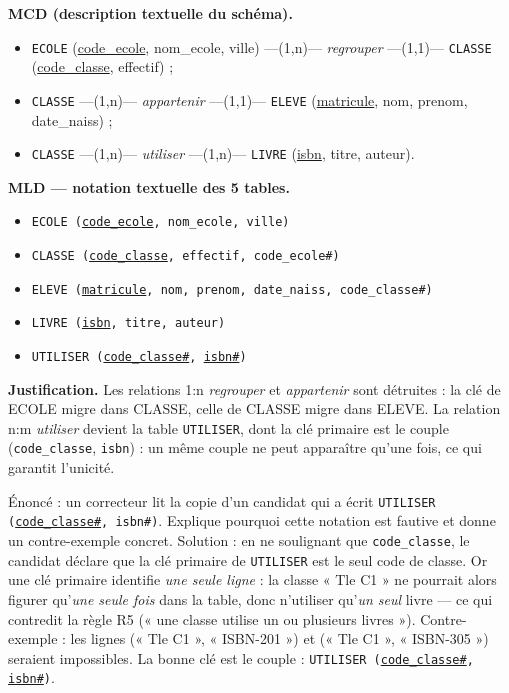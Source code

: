 \documentclass[11pt]{article}
\begin{document}
\begin{exemplebox}
\textbf{MCD (description textuelle du schéma).}
\begin{itemize}
  \item \texttt{ECOLE} (\underline{code\_ecole}, nom\_ecole, ville) ---(1,n)--- \emph{regrouper} ---(1,1)--- \texttt{CLASSE} (\underline{code\_classe}, effectif) ;
  \item \texttt{CLASSE} ---(1,n)--- \emph{appartenir} ---(1,1)--- \texttt{ELEVE} (\underline{matricule}, nom, prenom, date\_naiss) ;
  \item \texttt{CLASSE} ---(1,n)--- \emph{utiliser} ---(1,n)--- \texttt{LIVRE} (\underline{isbn}, titre, auteur).
\end{itemize}
\textbf{MLD — notation textuelle des 5 tables.}
\begin{itemize}
  \item \texttt{ECOLE (\underline{code\_ecole}, nom\_ecole, ville)}
  \item \texttt{CLASSE (\underline{code\_classe}, effectif, code\_ecole\#)}
  \item \texttt{ELEVE (\underline{matricule}, nom, prenom, date\_naiss, code\_classe\#)}
  \item \texttt{LIVRE (\underline{isbn}, titre, auteur)}
  \item \texttt{UTILISER (\underline{code\_classe\#}, \underline{isbn\#})}
\end{itemize}
\textbf{Justification.} Les relations 1:n \emph{regrouper} et \emph{appartenir} sont détruites : la clé de ECOLE migre dans CLASSE, celle de CLASSE migre dans ELEVE. La relation n:m \emph{utiliser} devient la table \texttt{UTILISER}, dont la clé primaire est le couple (\texttt{code\_classe}, \texttt{isbn}) : un même couple ne peut apparaître qu'une fois, ce qui garantit l'unicité.
\end{exemplebox}

\begin{exoresolu}
Énoncé : un correcteur lit la copie d'un candidat qui a écrit \texttt{UTILISER (\underline{code\_classe\#}, isbn\#)}. Explique pourquoi cette notation est fautive et donne un contre-exemple concret.
\tcblower
Solution : en ne soulignant que \texttt{code\_classe}, le candidat déclare que la clé primaire de \texttt{UTILISER} est le seul code de classe. Or une clé primaire identifie \emph{une seule ligne} : la classe « Tle C1 » ne pourrait alors figurer qu'\emph{une seule fois} dans la table, donc n'utiliser qu'\emph{un seul} livre — ce qui contredit la règle R5 (« une classe utilise un ou plusieurs livres »). Contre-exemple : les lignes (« Tle C1 », « ISBN-201 ») et (« Tle C1 », « ISBN-305 ») seraient impossibles. La bonne clé est le couple : \texttt{UTILISER (\underline{code\_classe\#}, \underline{isbn\#})}.
\end{exoresolu}
\end{document}

